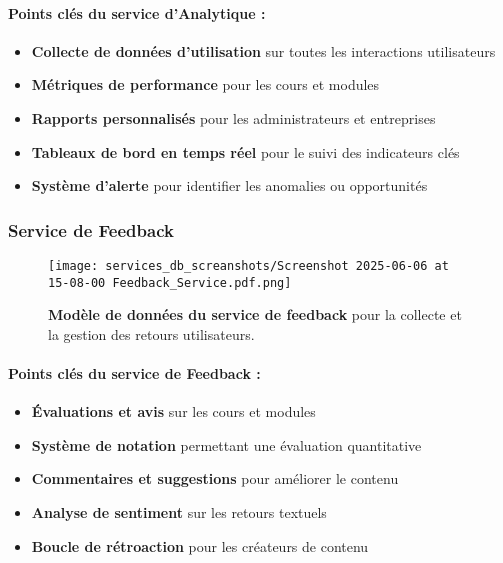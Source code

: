 \paragraph{Points clés du service d'Analytique :}
\begin{itemize}[leftmargin=*,noitemsep,topsep=0pt]
  \item \textbf{Collecte de données d'utilisation} sur toutes les interactions utilisateurs
  \item \textbf{Métriques de performance} pour les cours et modules
  \item \textbf{Rapports personnalisés} pour les administrateurs et entreprises
  \item \textbf{Tableaux de bord en temps réel} pour le suivi des indicateurs clés
  \item \textbf{Système d'alerte} pour identifier les anomalies ou opportunités
\end{itemize}
\normalsize
\newpage

\subsubsection{Service de Feedback}
\begin{figure}[h!]
  \centering
  \texttt{[image: services\_db\_screanshots/Screenshot 2025-06-06 at 15-08-00 Feedback\_Service.pdf.png]}
  \caption{\textbf{Modèle de données du service de feedback} pour la collecte et la gestion des retours utilisateurs.}
  \label{fig:feedback_service}
\end{figure}
\vspace{-10pt}
\small
\paragraph{Points clés du service de Feedback :}
\begin{itemize}[leftmargin=*,noitemsep,topsep=0pt]
  \item \textbf{Évaluations et avis} sur les cours et modules
  \item \textbf{Système de notation} permettant une évaluation quantitative
  \item \textbf{Commentaires et suggestions} pour améliorer le contenu
  \item \textbf{Analyse de sentiment} sur les retours textuels
  \item \textbf{Boucle de rétroaction} pour les créateurs de contenu
\end{itemize}
\normalsize
\newpage

